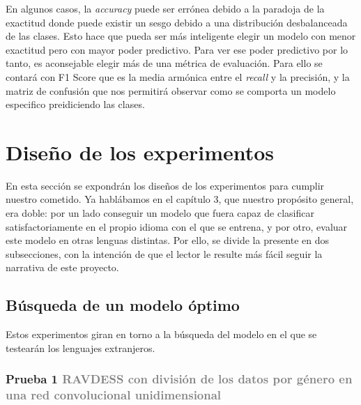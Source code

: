\documentclass[11pt,a4paper,spanish]{book}
\begin{document}
	En algunos casos, la \emph{accuracy} puede ser errónea debido a la paradoja de la exactitud donde puede existir un sesgo debido a una distribución desbalanceada de las clases. Esto hace que pueda ser más inteligente elegir un modelo con menor exactitud pero con mayor poder predictivo.
	Para ver ese poder predictivo por lo tanto, es aconsejable elegir más de una métrica de evaluación. Para ello se contará con F1 Score que es la media armónica entre el \emph{recall} y la precisión, y la matriz de confusión que nos permitirá observar como se comporta un modelo especifico preidiciendo las clases.
	
	
	\section{Diseño de los experimentos}
	En esta sección se expondrán los diseños de los experimentos para cumplir nuestro cometido. Ya hablábamos en el capítulo 3, que nuestro propósito general, era doble: por un lado conseguir un modelo que fuera capaz de clasificar satisfactoriamente en el propio idioma con el que se entrena, y por otro, evaluar este modelo en otras lenguas distintas. Por ello, se divide la presente en dos subsecciones, con la intención de que el lector le resulte más fácil seguir la narrativa de este proyecto.
	
	\subsection{Búsqueda de un  modelo óptimo}
	Estos experimentos giran en torno a la búsqueda del modelo en el que se testearán los lenguajes extranjeros.
	
	\subsubsection[]{\Large Prueba 1 {\normalsize \textcolor{Gray}{RAVDESS con división de los datos por género en una red convolucional unidimensional}}}
	
\end{document}

